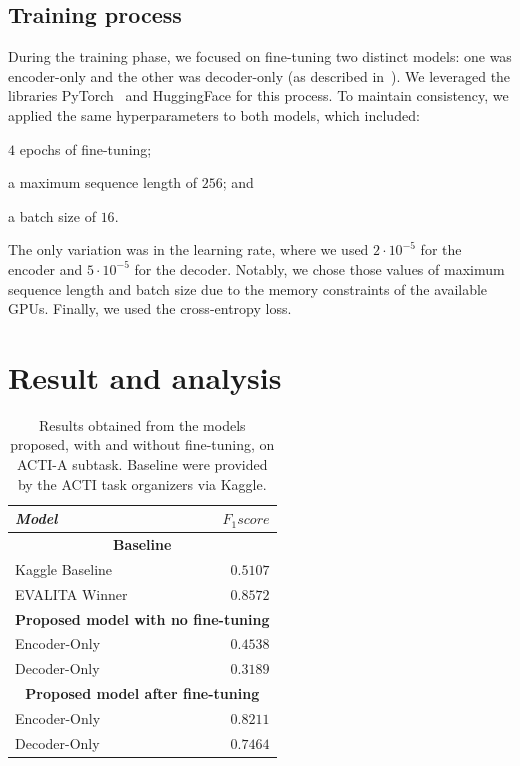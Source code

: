 \documentclass[11pt]{article}
\begin{document}
\subsection{Training process}\label{sec:training-process}
During the training phase, we focused on fine-tuning two distinct models: one was encoder-only and the
  other was decoder-only (as described in~).
  We leveraged the libraries PyTorch~\cite{NEURIPS2019_9015} and HuggingFace for this process.
  To maintain consistency, we applied the same hyperparameters to both models, which included:
  \begin{enumerate*}[label=(\roman{*})]
    \item $4$ epochs of fine-tuning;
    \item a maximum sequence length of $256$; and
    \item a batch size of $16$.
  \end{enumerate*}
  The only variation was in the learning rate, where we used $2 \cdot 10^{-5}$ for the encoder and $5 \cdot 10^{-5}$ for the decoder.
  Notably, we chose those values of maximum sequence length and batch size due to the memory constraints of the available GPUs.
  Finally, we used the cross-entropy loss.

\section{Result and analysis}\label{sec:results-analysis}

\def\arraystretch{1.2}%
\begin{table}
  \centering
  \begin{tabularx}{\columnwidth}{X r}

    \toprule
    \textit{Model} & $F_1 score$ \\
    \midrule\midrule

    \multicolumn{2}{c}{\textbf{Baseline}} \\
    \midrule
    Kaggle Baseline & $0.5107$    \\
    EVALITA Winner &   $0.8572$  \\
    
    \midrule
    \multicolumn{2}{c}{\textbf{Proposed model with no fine-tuning}} \\
    \midrule
    
    Encoder-Only &  $0.4538$    \\
    Decoder-Only &   $0.3189$  \\
    
    \midrule
    \multicolumn{2}{c}{\textbf{Proposed model after fine-tuning}}\\
    \midrule
    
    Encoder-Only &  $0.8211$    \\
    Decoder-Only &   $0.7464$  \\
    \bottomrule
  \end{tabularx}

  \caption{\label{table:results}
    Results obtained from the models proposed, with and without fine-tuning, 
    on ACTI-A subtask. Baseline were provided by the ACTI task organizers via Kaggle.
  }
\end{table}
\end{document}
